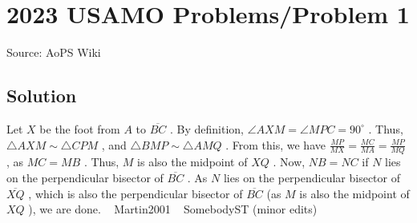 \documentclass[12pt]{article}
\begin{document}
\section*{{2023 USAMO Problems/Problem 1}}
Source: AoPS Wiki

\subsection*{Solution}
Let $X$ be the foot from $A$ to $\overline{BC}$ . By definition, $\angle AXM = \angle MPC = 90^{\circ}$ . Thus, $\triangle AXM \sim \triangle CPM$ , and $\triangle BMP \sim \triangle AMQ$ . From this, we have $\frac{MP}{MX} = \frac{MC}{MA} = \frac{MP}{MQ}$ , as $MC=MB$ . Thus, $M$ is also the midpoint of $XQ$ . Now, $NB = NC$ if $N$ lies on the perpendicular bisector of $\overline{BC}$ . As $N$ lies on the perpendicular bisector of $\overline{XQ}$ , which is also the perpendicular bisector of $\overline{BC}$ (as $M$ is also the midpoint of $XQ$ ), we are done.
~ Martin2001
~ SomebodyST (minor edits)
\end{document}
